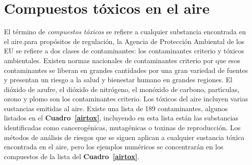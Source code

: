 \section{Compuestos t\'oxicos en el aire}
\normalsize
El t\'ermino de \emph{compuestos t\'oxicos} se refiere a cualquier substancia  encontrada en el aire.para prop\'ositos de regulaci\'on, la Agencia de Protecci\'on Ambiental de los EU se refiere a dos clases de contaminantes: los contaminantes criterio y t\'oxicos ambientales. Existen normas nacionales de contaminantes criterio por que esos contaminantes se liberan en grandes cantidades por una gran variedad de fuentes y presentan un riesgo a la salud y bienestar humano en grandes regiones. El di\'oxido de azufre, el di\'oxido de nitr\'ogeno, el mon\'oxido de carbono,  part\'{\i}culas, ozono  y plomo son los contaminantes criterio. Los t\'oxicos del aire incluyen varias sustancias emitidas al aire. Existe una lista de 189 contaminantes, algunos listados en el \textbf{Cuadro~\ref{airtox}}, incluyendo en esta lista est\'an las substancias identificadas como cancerog\'enicas, mutag\'enicas o toxinas de reproducci\'on. Los m\'etodos de an\'alisis de riesgos que se siguen aplican a cualquier sustancia t\'oxica encontrada en el aire, pero los ejemplos num\'ericos se concentrar\'an en los compuestos de la lista del \textbf{Cuadro~\ref{airtox}}.

